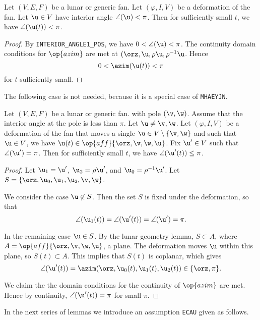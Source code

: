 \begin{lemma}[]
  Let $(V,E,F)$ be a lunar or generic fan.
Let $(\varphi,I,V)$ be a deformation of the fan.
Let $\u\in V$ have interior angle $\angle(\u)<\pi$.  Then for sufficiently small $t$, we have
$\angle(\u(t))<\pi$.
\end{lemma}

\begin{proof}
By {\tt INTERIOR\_ANGLE1\_POS}, we have $0 < \angle(\u) <\pi$.  The continuity domain conditions for $\op{azim}$
are met at $(\orz,\u,\rho\u,\rho^{-1}\u$.   Hence
\[
0 < \azim(\u(t)) < \pi
\]
for $t$ sufficiently small.
\end{proof}

The following case is not needed, because it is a special case of {\tt MHAEYJN}.

\begin{lemma}[]
  Let $(V,E,F)$ be a lunar or generic fan.
 with pole $(\v,\w)$.  Assume that the interior angle at the pole
is less than $\pi$.  Let $\u\ne \v,\w$.  
Let $(\varphi,I,V)$ be a deformation of the fan that moves a single $\u\in V\setminus\{\v,\w\}$ and
 such that  $\u\in V$, we have $\u(t)\in \op{aff}\{\orz,\v,\w,\u\}$.
Fix $\u'\in V$ such that $\angle(\u')=\pi$.  Then for sufficiently small $t$, we have
$\angle(\u'(t))\le\pi$.
\end{lemma}

\begin{proof}  Let $\u_1=\u'$, $\u_2=\rho\u'$, and $\u_0 = \rho^{-1}\u'$.  
Let $S=\{\orz,\u_0,\u_1,\u_2,\v,\w\}$.

We consider the case $\u\not\in S$.  
Then the set $S$ is fixed under the deformation, so
that 
\[
\angle(\u_1(t)) = \angle(\u'(t)) =\angle(\u') =\pi.
\]

In the remaining case $\u\in S$.  
By the lunar geometry
lemma, $S \subset A$, where $A = \op{aff}\{\orz,\v,\w,\u\}$, a plane.
The deformation moves $\u$ within this plane, so $S(t)\subset A$.  This implies that $S(t)$ is coplanar,
which gives 
\[
\angle(\u'(t))=\azim(\orz,\u_0(t),\u_1(t),\u_2(t))\in \{\orz,\pi\}.
\]

We claim the the domain conditions for the continuity of $\op{azim}$ are met.  Hence
by continuity, $\angle(\u'(t))=\pi$ for small $\pi$.
\end{proof}

In the next series of lemmas we introduce an assumption {\tt ECAU} given as follows.


